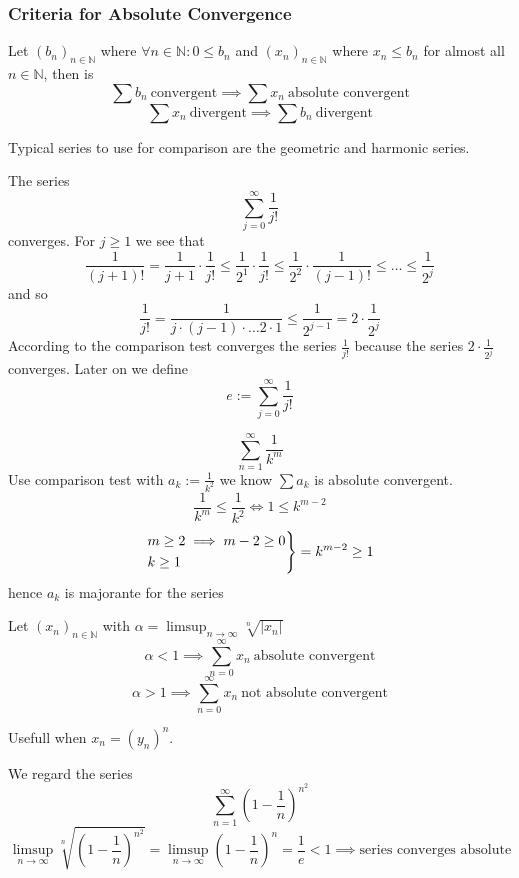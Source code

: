 \subsubsection{Criteria for Absolute Convergence}
\begin{proposition}\label{pro:comparison_test}
   Let \((b_n)_{n \in \mathbb{N}}\) where \(\forall n \in \mathbb{N}: 0 \leq b_n\) and \((x_n)_{n \in \mathbb{N}}\) where \(x_n \leq b_n\) for almost all \(n \in \mathbb{N}\), then is
   \[\sum b_n~\text{convergent} \implies \sum x_n~\text{absolute convergent}\]
   \[\sum x_n~\text{divergent} \implies \sum b_n~\text{divergent}\]
\end{proposition}
\begin{remark}
   Typical series to use for comparison are the geometric and harmonic series.
\end{remark}
\begin{example}
   The series
   \[\sum_{j=0}^\infty \frac{1}{j!}\]
   converges.
   For \(j \geq 1\) we see that
   \[\frac{1}{(j + 1)!} = \frac{1}{j + 1} \cdot \frac{1}{j!} \leq \frac{1}{2^1} \cdot \frac{1}{j!} \leq \frac{1}{2^2} \cdot \frac{1}{(j - 1)!} \leq \ldots \leq \frac{1}{2^j}\]
   and so
   \[\frac{1}{j!} = \frac{1}{j \cdot (j - 1) \cdot \ldots 2 \cdot 1} \leq \frac{1}{2^{j-1}} = 2 \cdot \frac{1}{2^j}\]
   According to the comparison test converges the series \(\frac{1}{j!}\) because the series \(2 \cdot \frac{1}{2^j}\) converges.
   Later on we define
   \[e := \sum_{j=0}^\infty \frac{1}{j!}\]
\end{example}
\begin{example}
   \[\sum_{n=1}^\infty \frac{1}{k^m}\]
   Use comparison test with \(a_k := \frac{1}{k^2}\) we know \(\sum a_k\) is absolute convergent.
   \[\frac{1}{k^m} \leq \frac{1}{k^2} \iff 1 \leq k^{m-2}\]
   \[\begin{drcases}m \geq 2 \implies m-2 \geq 0\\k \geq 1\end{drcases} = k^{m-2} \geq 1\]
   hence \(a_k\) is majorante for the series 
\end{example}

\begin{proposition}\label{pro:root_test}
   Let \((x_n)_{n \in \mathbb{N}}\) with \(\alpha = \limsup_{n \to \infty} \sqrt[n]{|x_n|}\)
   \[\alpha < 1 \implies \sum_{n=0}^\infty x_n~\text{absolute convergent}\]
   \[\alpha > 1 \implies \sum_{n=0}^\infty x_n~\text{not absolute convergent}\]
\end{proposition}
\begin{remark}
   Usefull when \(x_n = (y_n)^n\).
\end{remark}
\begin{example}
   We regard the series
   \[\sum_{n=1}^\infty \left(1 - \frac{1}{n}\right)^{n^2}\]
   \[\limsup_{n \to \infty} \sqrt[n]{\left(1 - \frac{1}{n}\right)^{n^2}} = \limsup_{n \to \infty} \left(1 - \frac{1}{n}\right)^n = \frac{1}{e} < 1 \implies \text{series converges absolute}\]
\end{example}

